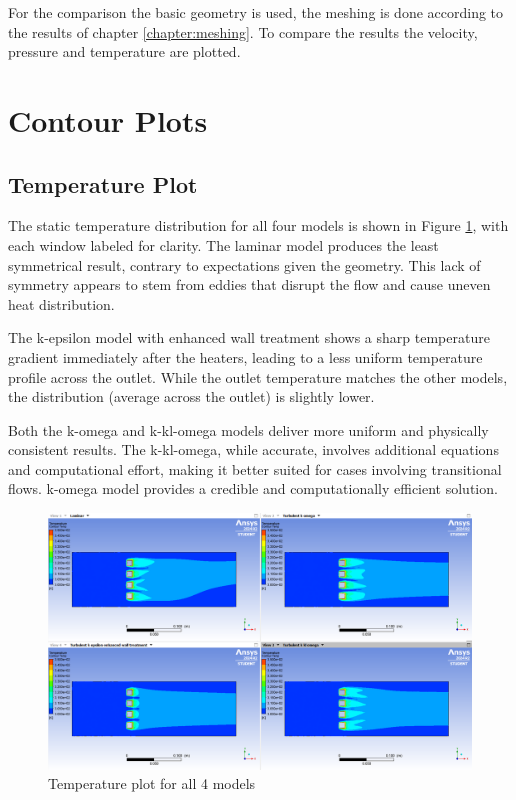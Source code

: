 \clearpage

For the comparison the basic geometry is used, the meshing is done according to the results of chapter \ref{chapter:meshing}.
To compare the results the velocity, pressure and temperature are plotted.

\section{Contour Plots}

\subsection{Temperature Plot}

The static temperature distribution for all four models is shown in Figure \ref{fig:temp_plot}, with each window labeled for clarity. The laminar model produces the least symmetrical result, contrary to expectations given the geometry. This lack of symmetry appears to stem from eddies that disrupt the flow and cause uneven heat distribution.

The k-epsilon model with enhanced wall treatment shows a sharp temperature gradient immediately after the heaters, leading to a less uniform temperature profile across the outlet. While the outlet temperature matches the other models, the distribution (average across the outlet) is slightly lower.

Both the k-omega and k-kl-omega models deliver more uniform and physically consistent results. The k-kl-omega, while accurate, involves additional equations and computational effort, making it better suited for cases involving transitional flows. k-omega model provides a credible and computationally efficient solution.

\begin{figure}[htbp]   
    \centering
    \includegraphics[width=1\textwidth]{img/Temp_plot_comparison.png}
    \caption{Temperature plot for all 4 models}
    \label{fig:temp_plot}
\end{figure}

